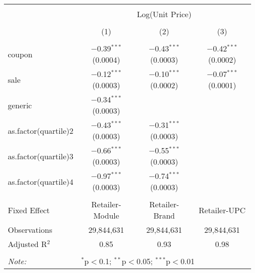 
\begin{table}[!htbp] \centering 
  \caption{} 
  \label{tab:overallSavingsStorable} 
\begin{tabular}{@{\extracolsep{5pt}}lccc} 
\\[-1.8ex]\hline 
\hline \\[-1.8ex] 
 & \multicolumn{3}{c}{Log(Unit Price)} \\ 
\\[-1.8ex] & (1) & (2) & (3)\\ 
\hline \\[-1.8ex] 
 coupon & $-$0.39$^{***}$ (0.0004) & $-$0.43$^{***}$ (0.0003) & $-$0.42$^{***}$ (0.0002) \\ 
  sale & $-$0.12$^{***}$ (0.0003) & $-$0.10$^{***}$ (0.0002) & $-$0.07$^{***}$ (0.0001) \\ 
  generic & $-$0.34$^{***}$ (0.0003) &  &  \\ 
  as.factor(quartile)2 & $-$0.43$^{***}$ (0.0003) & $-$0.31$^{***}$ (0.0003) &  \\ 
  as.factor(quartile)3 & $-$0.66$^{***}$ (0.0003) & $-$0.55$^{***}$ (0.0003) &  \\ 
  as.factor(quartile)4 & $-$0.97$^{***}$ (0.0003) & $-$0.74$^{***}$ (0.0003) &  \\ 
 \hline \\[-1.8ex] 
Fixed Effect & Retailer-Module & Retailer-Brand & Retailer-UPC \\ 
Observations & 29,844,631 & 29,844,631 & 29,844,631 \\ 
Adjusted R$^{2}$ & 0.85 & 0.93 & 0.98 \\ 
\hline 
\hline \\[-1.8ex] 
\textit{Note:}  & \multicolumn{3}{l}{$^{*}$p$<$0.1; $^{**}$p$<$0.05; $^{***}$p$<$0.01} \\ 
\end{tabular} 
\end{table} 
